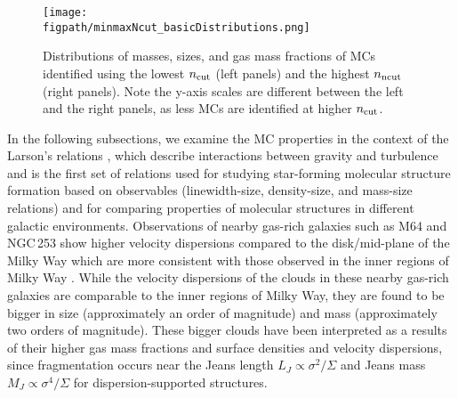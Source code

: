 \documentclass[iop]{emulateapj} %
\begin{document}
\begin{figure*}[htbp]
\centering
\texttt{[image: \\figpath/minmaxNcut\_basicDistributions.png]}
\caption{
Distributions of masses, sizes, and gas mass fractions of MCs identified using 
the lowest $n_{\rm cut}$ (left panels) and the highest $n_{\rm ncut}$ (right panels).
Note the y-axis scales are different between the left and the right panels, as less MCs are identified 
at higher $n_{\rm cut}$.
\label{fig:dist}}
\end{figure*}




In the following subsections,
we examine the MC properties in the context of the Larson's relations \citep{Larson81a}, which
describe interactions between gravity and turbulence and is the first set of 
relations used for studying star-forming molecular structure formation based on observables (linewidth-size,
density-size, and mass-size relations) and for comparing properties of molecular structures
in different galactic environments.
Observations of nearby gas-rich galaxies such as M64 and NGC\,253
show higher velocity dispersions compared
to the disk/mid-plane of the Milky Way which
are more consistent with those observed in the inner regions of
Milky Way \citep{Oka01a, Rosolowsky05a, Heyer09a, Leroy15a}.  %
While the velocity dispersions of the clouds in these nearby gas-rich galaxies are comparable
to the inner regions of Milky Way, they are found to be bigger in size (approximately
an order of magnitude) and mass (approximately two orders of magnitude).
These bigger clouds have been interpreted as a results of their higher gas mass fractions and
surface densities and velocity dispersions, since
fragmentation occurs near the Jeans length $L_J\propto\sigma^2/\Sigma$
and Jeans mass $M_J\propto\sigma^4/\Sigma$
for dispersion-supported structures.
\end{document}
